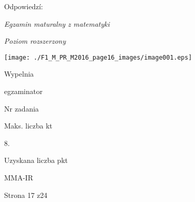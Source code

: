 \documentclass[a4paper,12pt]{article}
\begin{document}
Odpowiedzí:

{\it Egzamin maturalny z matematyki}

{\it Poziom rozszerzony}
\begin{center}
\texttt{[image: ./F1\_M\_PR\_M2016\_page16\_images/image001.eps]}
\end{center}
Wypelnia

egzaminator

Nr zadania

Maks. liczba kt

8.

Uzyskana liczba pkt

MMA-IR

Strona 17 z24
\end{document}
